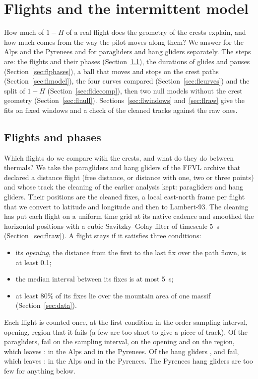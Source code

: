 \section{Flights and the intermittent model}\label{sec:flights}

How much of $1-H$ of a real flight does the geometry of the crests explain, and how much comes from the way the
pilot moves along them? We answer for the Alps and the Pyrenees and for paragliders and hang gliders
separately. The steps are: the flights and their phases (Section~\ref{sec:flsel}), the durations of glides and
pauses (Section~\ref{sec:flphases}), a ball that moves and stops on the crest paths (Section~\ref{sec:flmodel}),
the four curves compared (Section~\ref{sec:flcurves}) and the split of $1-H$ (Section~\ref{sec:fldecomp}), then two null
models without the crest geometry (Section~\ref{sec:flnull}).
Sections~\ref{sec:flwindows} and~\ref{sec:flraw} give the fits on fixed windows and a check of the cleaned
tracks against the raw ones.

\subsection{Flights and phases}\label{sec:flsel}

Which flights do we compare with the crests, and what do they do between thermals? We take the paragliders and
hang gliders of the FFVL archive that declared a distance flight (free distance, or distance with one, two or
three points) and whose track the cleaning of the earlier analysis kept: \flCandPara{} paragliders and
\flCandHang{} hang gliders. Their positions are the cleaned fixes, a local east-north frame per flight that we
convert to latitude and longitude and then to Lambert-93. The cleaning has put each flight on a uniform time
grid at its native cadence and smoothed the horizontal positions with a cubic Savitzky--Golay filter of
timescale 5~s (Section~\ref{sec:flraw}). A flight stays if it satisfies three conditions:
\begin{itemize}[nosep]
  \item its \emph{opening}, the distance from the first to the last fix over the path flown, is at least 0.1;
  \item the median interval between its fixes is at most 5~s;
  \item at least 80\% of its fixes lie over the mountain area of one massif (Section~\ref{sec:data}).
\end{itemize}
Each flight is counted once, at the first condition in the order sampling interval, opening, region that it
fails (a few are too short to give a piece of track). Of the paragliders, \flStatDtPara{} fail on the sampling
interval, \flStatOpeningPara{} on the opening and \flStatRegionPara{} on the region, which leaves
\flStatOkPara{}: \flSelAlpsPara{} in the Alps and \flSelPyrPara{} in the Pyrenees. Of the hang gliders
\flStatDtHang{}, \flStatOpeningHang{} and \flStatRegionHang{} fail, which leaves \flStatOkHang{}:
\flSelAlpsHang{} in the Alps and \flSelPyrHang{} in the Pyrenees. The Pyrenees hang gliders are too few for
anything below.

